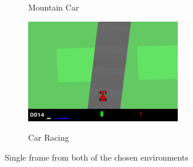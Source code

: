 \begin{figure}[H]
  \centering
  \begin{subfigure}{0.45\linewidth}
    \caption{Mountain Car}
  \end{subfigure}
  \hfill
  \begin{subfigure}{0.45\linewidth}
    {\includegraphics[height=4.5cm]{figures/images/car_racing_frame.png}}
    \caption{Car Racing}
  \end{subfigure}
  \caption[Frame from both environments]{Single frame from both of the chosen environments}
  \label{fig:game_frames}
\end{figure}
